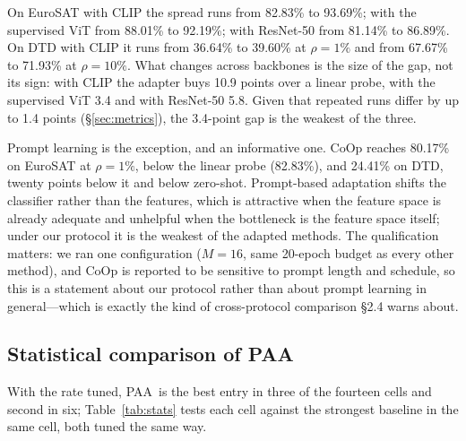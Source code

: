 \documentclass[preprint,12pt]{elsarticle}
\newcommand{\ours}{\textsc{PAA}}
\begin{document}
On EuroSAT with CLIP the spread runs from 82.83\% to 93.69\%; with the supervised
ViT from 88.01\% to 92.19\%; with ResNet-50 from 81.14\% to 86.89\%. On DTD with
CLIP it runs from 36.64\% to 39.60\% at $\rho=1\%$ and from 67.67\% to 71.93\% at
$\rho=10\%$. What changes across backbones is the size of the gap, not its sign:
with CLIP the adapter buys 10.9 points over a linear probe, with the supervised
ViT 3.4 and with ResNet-50 5.8. Given that repeated runs differ by up to 1.4
points (\S\ref{sec:metrics}), the 3.4-point gap is the weakest of the three.

Prompt learning is the exception, and an informative one. CoOp reaches 80.17\% on
EuroSAT at $\rho=1\%$, below the linear probe (82.83\%), and 24.41\% on DTD,
twenty points below it and below zero-shot. Prompt-based adaptation shifts the
classifier rather than the features, which is attractive when the feature space
is already adequate and unhelpful when the bottleneck is the feature space
itself; under our protocol it is the weakest of the adapted methods. The
qualification matters: we ran one configuration ($M=16$, same 20-epoch budget as
every other method), and CoOp is reported to be sensitive to prompt length and
schedule, so this is a statement about our protocol rather than about prompt
learning in general---which is exactly the kind of cross-protocol comparison
\S2.4 warns about.

\subsection{Statistical comparison of \ours}
\label{sec:stats}

With the rate tuned, \ours\ is the best entry in three of the fourteen cells and
second in six; Table~\ref{tab:stats} tests each cell against the strongest
baseline in the same cell, both tuned the same way.
\end{document}
